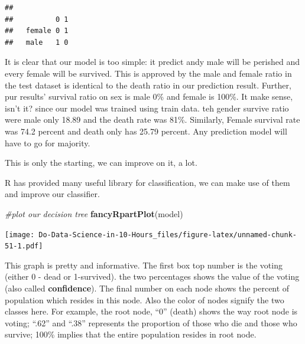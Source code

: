 \documentclass[
]{book}
\newenvironment{Shaded}{\begin{snugshade}}{\end{snugshade}}
\newcommand{\CommentTok}[1]{\textcolor[rgb]{0.56,0.35,0.01}{\textit{#1}}}
\newcommand{\DecValTok}[1]{\textcolor[rgb]{0.00,0.00,0.81}{#1}}
\newcommand{\KeywordTok}[1]{\textcolor[rgb]{0.13,0.29,0.53}{\textbf{#1}}}
\newcommand{\NormalTok}[1]{#1}
\newcommand{\OperatorTok}[1]{\textcolor[rgb]{0.81,0.36,0.00}{\textbf{#1}}}
\begin{document}
\begin{Shaded}
\end{Shaded}

\begin{verbatim}
##         
##          0 1
##   female 0 1
##   male   1 0
\end{verbatim}

It is clear that our model is too simple: it predict andy male will be perished and every female will be survived. This is approved by the male and female ratio in the test dataset is identical to the death ratio in our prediction result. Further, pur results' survival ratio on sex is male 0\% and female is 100\%. It make sense, isn't it? since our model was trained using train data. teh gender survive ratio were male only 18.89 and the death rate was 81\%. Similarly, Female survival rate was 74.2 percent and death only has 25.79 percent. Any prediction model will have to go for majority.

This is only the starting, we can improve on it, a lot.

R has provided many useful library for classification, we can make use of them and improve our classifier.

\begin{Shaded}
\begin{Highlighting}[]
\CommentTok{#plot our decision tree}
\KeywordTok{fancyRpartPlot}\NormalTok{(model)}
\end{Highlighting}
\end{Shaded}

\texttt{[image: Do-Data-Science-in-10-Hours\_files/figure-latex/unnamed-chunk-51-1.pdf]}

This graph is pretty and informative. The first box top number is the voting (either 0 - dead or 1-survived). the two percentages shows the value of the voting (also called \textbf{confidence}). The final number on each node shows the percent of population which resides in this node. Also the color of nodes signify the two classes here. For example, the root node, ``0'' (death) shows the way root node is voting; ``.62'' and ``.38'' represents the proportion of those who die and those who survive; 100\% implies that the entire population resides in root node.
\end{document}

